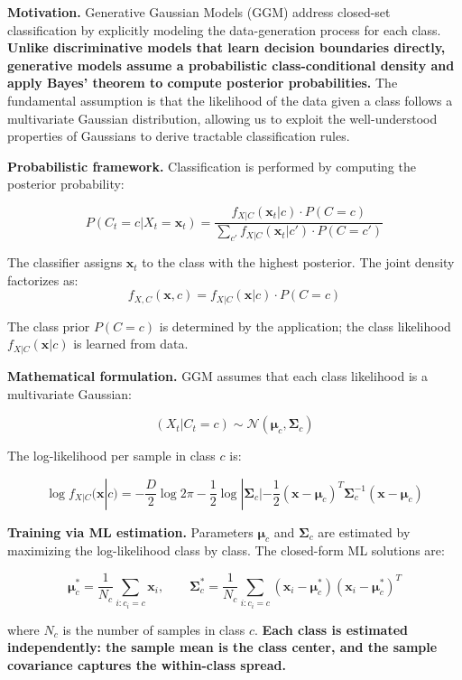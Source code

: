 \textbf{Motivation.} Generative Gaussian Models (GGM) address closed-set classification by explicitly modeling the data-generation process for each class. \textbf{Unlike discriminative models that learn decision boundaries directly, generative models assume a probabilistic class-conditional density and apply Bayes' theorem to compute posterior probabilities.} The fundamental assumption is that the likelihood of the data given a class follows a multivariate Gaussian distribution, allowing us to exploit the well-understood properties of Gaussians to derive tractable classification rules.

\textbf{Probabilistic framework.} Classification is performed by computing the posterior probability:

$$P(C_t = c | X_t = \mathbf{x}_t) = \frac{f_{X|C}(\mathbf{x}_t | c) \cdot P(C = c)}{\sum_{c'} f_{X|C}(\mathbf{x}_t | c') \cdot P(C = c')}$$

The classifier assigns $\mathbf{x}_t$ to the class with the highest posterior. The joint density factorizes as:
$$f_{X,C}(\mathbf{x}, c) = f_{X|C}(\mathbf{x}|c) \cdot P(C = c)$$

The class prior $P(C = c)$ is determined by the application; the class likelihood $f_{X|C}(\mathbf{x}|c)$ is learned from data.

\textbf{Mathematical formulation.} GGM assumes that each class likelihood is a multivariate Gaussian:

$$(X_t | C_t = c) \sim \mathcal{N}(\boldsymbol{\mu}_c, \boldsymbol{\Sigma}_c)$$

The log-likelihood per sample in class $c$ is:

$$\log f_{X|C}(\mathbf{x}|c) = -\frac{D}{2}\log 2\pi - \frac{1}{2}\log|\boldsymbol{\Sigma}_c| - \frac{1}{2}(\mathbf{x}-\boldsymbol{\mu}_c)^T\boldsymbol{\Sigma}_c^{-1}(\mathbf{x}-\boldsymbol{\mu}_c)$$

\textbf{Training via ML estimation.} Parameters $\boldsymbol{\mu}_c$ and $\boldsymbol{\Sigma}_c$ are estimated by maximizing the log-likelihood class by class. The closed-form ML solutions are:

$$\boldsymbol{\mu}_c^* = \frac{1}{N_c}\sum_{i: c_i = c} \mathbf{x}_i, \qquad \boldsymbol{\Sigma}_c^* = \frac{1}{N_c}\sum_{i: c_i = c} (\mathbf{x}_i - \boldsymbol{\mu}_c^*)(\mathbf{x}_i - \boldsymbol{\mu}_c^*)^T$$

where $N_c$ is the number of samples in class $c$. \textbf{Each class is estimated independently: the sample mean is the class center, and the sample covariance captures the within-class spread.}


